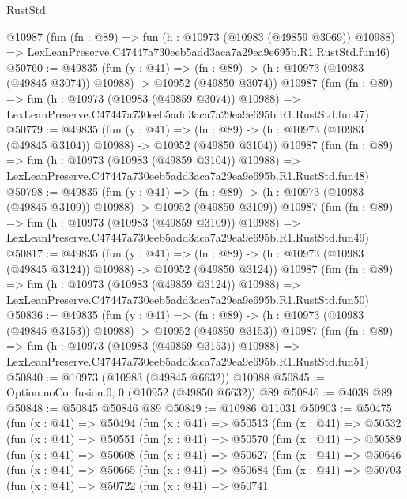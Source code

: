 \begin{lexlean}{RustStd}
\begin{coremodule}
    @10987
    (fun (fn : @89) =>
    fun (h : @10973 (@10983 (@49859 @3069)) @10988) =>
    LexLeanPreserve.C47447a730eeb5add3aca7a29ea9e695b.R1.RustStd.fun46)
@50760 := @49835
    (fun (y : @41) =>
    (fn : @89) -> (h : @10973 (@10983 (@49845 @3074)) @10988) -> @10952 (@49850 @3074))
    @10987
    (fun (fn : @89) =>
    fun (h : @10973 (@10983 (@49859 @3074)) @10988) =>
    LexLeanPreserve.C47447a730eeb5add3aca7a29ea9e695b.R1.RustStd.fun47)
@50779 := @49835
    (fun (y : @41) =>
    (fn : @89) -> (h : @10973 (@10983 (@49845 @3104)) @10988) -> @10952 (@49850 @3104))
    @10987
    (fun (fn : @89) =>
    fun (h : @10973 (@10983 (@49859 @3104)) @10988) =>
    LexLeanPreserve.C47447a730eeb5add3aca7a29ea9e695b.R1.RustStd.fun48)
@50798 := @49835
    (fun (y : @41) =>
    (fn : @89) -> (h : @10973 (@10983 (@49845 @3109)) @10988) -> @10952 (@49850 @3109))
    @10987
    (fun (fn : @89) =>
    fun (h : @10973 (@10983 (@49859 @3109)) @10988) =>
    LexLeanPreserve.C47447a730eeb5add3aca7a29ea9e695b.R1.RustStd.fun49)
@50817 := @49835
    (fun (y : @41) =>
    (fn : @89) -> (h : @10973 (@10983 (@49845 @3124)) @10988) -> @10952 (@49850 @3124))
    @10987
    (fun (fn : @89) =>
    fun (h : @10973 (@10983 (@49859 @3124)) @10988) =>
    LexLeanPreserve.C47447a730eeb5add3aca7a29ea9e695b.R1.RustStd.fun50)
@50836 := @49835
    (fun (y : @41) =>
    (fn : @89) -> (h : @10973 (@10983 (@49845 @3153)) @10988) -> @10952 (@49850 @3153))
    @10987
    (fun (fn : @89) =>
    fun (h : @10973 (@10983 (@49859 @3153)) @10988) =>
    LexLeanPreserve.C47447a730eeb5add3aca7a29ea9e695b.R1.RustStd.fun51)
@50840 := @10973 (@10983 (@49845 @6632)) @10988
@50845 := Option.noConfusion.{0, 0} (@10952 (@49850 @6632)) @89
@50846 := @4038 @89
@50848 := @50845 @50846 @89
@50849 := @10986 @11031
@50903 := @50475
    (fun (x : @41) =>
    @50494
      (fun (x : @41) =>
      @50513
        (fun (x : @41) =>
        @50532
          (fun (x : @41) =>
          @50551
            (fun (x : @41) =>
            @50570
              (fun (x : @41) =>
              @50589
                (fun (x : @41) =>
                @50608
                  (fun (x : @41) =>
                  @50627
                    (fun (x : @41) =>
                    @50646
                      (fun (x : @41) =>
                      @50665
                        (fun (x : @41) =>
                        @50684
                          (fun (x : @41) =>
                          @50703
                            (fun (x : @41) =>
                            @50722
                              (fun (x : @41) =>
                              @50741

\end{coremodule}
\end{lexlean}
